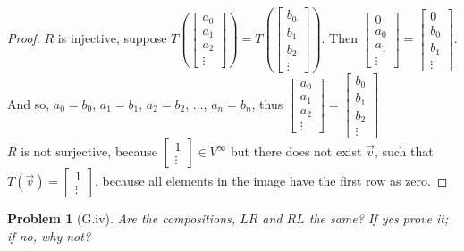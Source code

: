 \documentclass[12pt]{article}   %
\renewcommand{\a}{\alpha}
\renewcommand{\b}{\beta}
\newtheorem{problem}{Problem}
\begin{document}
\begin{proof}
$R$ is injective, suppose $T\left (\begin{bmatrix}a_0\\a_1\\a_2\\\vdots\end{bmatrix} \right )=T\left ( \begin{bmatrix}b_0\\b_1\\b_2\\\vdots\end{bmatrix}\right )$. Then $\begin{bmatrix}0\\a_0\\a_1\\\vdots\end{bmatrix}=\begin{bmatrix}
0\\b_0\\b_1\\\vdots
\end{bmatrix}$. And so, $a_0=b_0$, $a_1=b_1$, $a_2=b_2$, $\dots$, $a_n=b_n$, thus $\begin{bmatrix}
a_0\\a_1\\a_2\\\vdots
\end{bmatrix}=\begin{bmatrix}
b_0\\b_1\\b_2\\\vdots
\end{bmatrix}$\\
$R$ is not surjective, because $\begin{bmatrix}
1\\\vdots
\end{bmatrix}\in V^{\infty}$ but there does not exist $\vec{v}$, such that $T(\vec{v})=\begin{bmatrix}
1\\\vdots
\end{bmatrix}$, because all elements in the image have the first row as zero.
\end{proof}
\begin{problem}[G.iv]
Are the compositions, $LR$ and $RL$ the same? If yes prove it; if no, why not?
\end{problem}
\end{document}
